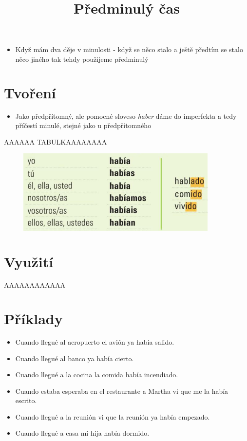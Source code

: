 \documentclass{article}
\title{\vspace{-2cm}Předminulý čas\vspace{-1.7cm}}
\date{}
\author{}
\begin{document}
\maketitle
\begin{itemize}
  \item Když mám dva děje v minulosti - když se něco stalo a ještě předtím se stalo něco jiného tak tehdy použijeme předminulý
\end{itemize}
\section{Tvoření}
\begin{itemize}
  \item Jako předpřítomný, ale pomocné sloveso \textit{haber} dáme do imperfekta a tedy příčestí minulé, stejné jako u předpřítomného
\end{itemize}
AAAAAA TABULKAAAAAAAA
\begin{figure}[h]
    \includegraphics[width=\linewidth]{predminuly_tabulka.png}
    \caption{}
\end{figure}

\section{Využití}
AAAAAAAAAAAA
\section{Příklady}
\begin{itemize}
  \item Cuando llegué al aeropuerto el avión ya había salido.
  \item Cuando llegué al banco ya había cierto.
  \item Cuando llegué a la cocina la comida había incendiado.
  \item Cuando estaba esperaba en el restaurante a Martha vi que me la había escrito.
  \item Cuando llegué a la reunión vi que la reunión ya había empezado.
  \item Cuando llegué a casa mi hija había dormido.
\end{itemize}
\end{document}
